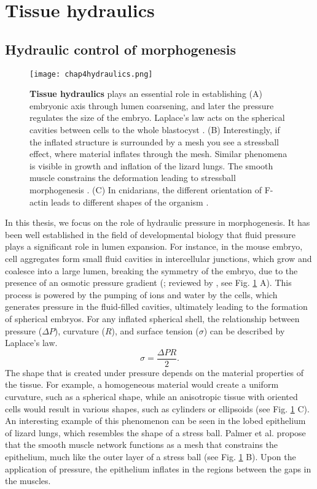 \hypertarget{tissue-hydraulics}{%
	\section{Tissue hydraulics}\label{tissue-hydraulics}}

\hypertarget{hydraulic-control-of-morphogenesis}{%
	\subsection{Hydraulic control of morphogenesis}\label{hydraulic-control-of-morphogenesis}}


\begin{figure}
	\centering
	\texttt{[image: chap4hydraulics.png]}
	\caption{\label{fig_4_7} \textbf{ Tissue hydraulics} plays an essential role in establishing (A) embryonic axis through lumen coarsening, and later the pressure regulates the size of the embryo. Laplace's law acts on the spherical cavities between cells to the whole blastocyst \cite{dumortier2019,chan2019, collinet2021}. (B) Interestingly, if the inflated structure is surrounded by a mesh you see a stressball effect, where material inflates through the mesh. Similar phenomena is visible in growth and inflation of the lizard lungs. The smooth muscle constrains the deformation leading to stressball morphogenesis \cite{palmer2021}. (C) In cnidarians, the different orientation of F-actin leads to different shapes of the organism \cite{stokkermans2022}.
	}
\end{figure}

In this thesis, we focus on the role of hydraulic pressure in morphogenesis. It has been well established in the field of developmental biology that fluid pressure plays a significant role in lumen expansion. For instance, in the mouse embryo, cell aggregates form small fluid cavities in intercellular junctions, which grow and coalesce into a large lumen, breaking the symmetry of the embryo, due to the presence of an osmotic pressure gradient (\cite{dumortier2019}; reviewed by \cite{torres-sanchez2021}, see Fig. \ref{fig_4_7} A). This process is powered by the pumping of ions and water by the cells, which generates pressure in the fluid-filled cavities, ultimately leading to the formation of spherical embryos. For any inflated spherical shell, the relationship between pressure ($\Delta P$), curvature ($R$), and surface tension ($\sigma$) can be described by Laplace's law. 
$$ \sigma = \frac{\Delta P R}{2}. $$ 
The shape that is created under pressure depends on the material properties of the tissue. For example, a homogeneous material would create a uniform curvature, such as a spherical shape, while an anisotropic tissue with oriented cells would result in various shapes, such as cylinders or ellipsoids \cite{stokkermans2021} (see Fig. \ref{fig_4_7} C). An interesting example of this phenomenon can be seen in the lobed epithelium of lizard lungs, which resembles the shape of a stress ball. Palmer et al. propose that the smooth muscle network functions as a mesh that constrains the epithelium, much like the outer layer of a stress ball \cite{palmer2021} (see Fig. \ref{fig_4_7} B). Upon the application of pressure, the epithelium inflates in the regions between the gaps in the muscles.

